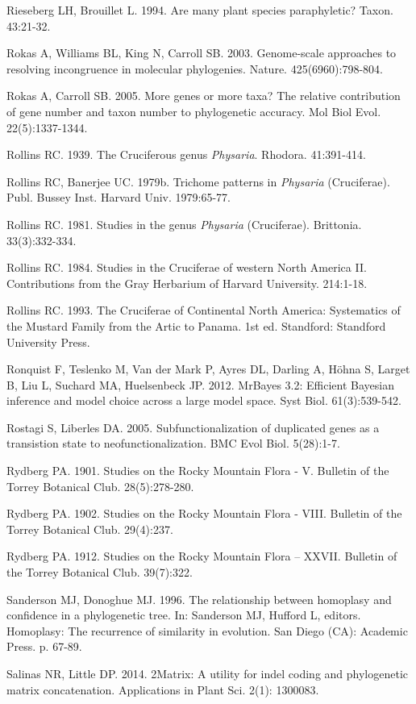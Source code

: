 Rieseberg LH, Brouillet L. 1994. Are many plant species paraphyletic? Taxon. 43:21-32.

Rokas A, Williams BL, King N, Carroll SB. 2003. Genome-scale approaches to resolving incongruence in molecular phylogenies. Nature. 425(6960):798-804.

Rokas A, Carroll SB. 2005. More genes or more taxa? The relative contribution of gene number and taxon number to phylogenetic accuracy. Mol Biol Evol. 22(5):1337-1344.

Rollins RC. 1939. The Cruciferous genus \textit{Physaria}. Rhodora. 41:391-414.

Rollins RC, Banerjee UC. 1979b. Trichome patterns in \textit{Physaria} (Cruciferae). Publ. Bussey Inst. Harvard Univ. 1979:65-77.

Rollins RC. 1981. Studies in the genus \textit{Physaria} (Cruciferae). Brittonia. 33(3):332-334.

Rollins RC. 1984. Studies in the Cruciferae of western North America II. Contributions from the Gray Herbarium of Harvard University. 214:1-18.

Rollins RC. 1993. The Cruciferae of Continental North America: Systematics of the Mustard Family from the Artic to Panama. 1st ed. Standford: Standford University Press.

Ronquist F, Teslenko M, Van der Mark P, Ayres DL, Darling A, Höhna S, Larget B, Liu L, Suchard MA, Huelsenbeck JP. 2012. MrBayes 3.2: Efficient Bayesian inference and model choice across a large model space. Syst Biol. 61(3):539-542.

Rostagi S, Liberles DA. 2005. Subfunctionalization of duplicated genes as a transistion state to neofunctionalization. BMC Evol Biol. 5(28):1-7.

Rydberg PA. 1901. Studies on the Rocky Mountain Flora - V. Bulletin of the Torrey Botanical Club. 28(5):278-280.

Rydberg PA. 1902. Studies on the Rocky Mountain Flora - VIII. Bulletin of the Torrey Botanical Club. 29(4):237.

Rydberg PA. 1912. Studies on the Rocky Mountain Flora – XXVII. Bulletin of the Torrey Botanical Club. 39(7):322.

Sanderson MJ, Donoghue MJ. 1996. The relationship between homoplasy and confidence in a phylogenetic tree. In: Sanderson MJ, Hufford L, editors. Homoplasy: The recurrence of similarity in evolution. San Diego (CA): Academic Press. p. 67-89.

Salinas NR, Little DP. 2014. 2Matrix: A utility for indel coding and phylogenetic matrix concatenation. Applications in Plant Sci. 2(1): 1300083.

